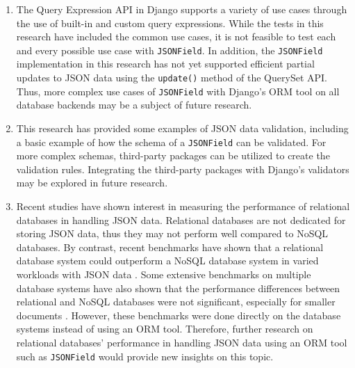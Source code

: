 \begin{enumerate}
	\item The Query Expression API in Django supports a variety of use cases
		  through the use of built-in and custom query expressions. While the
		  tests in this research have included the common use cases, it is not
		  feasible to test each and every possible use case with
		  \verb|JSONField|. In addition, the \verb|JSONField| implementation in
		  this research has not yet supported efficient partial updates to JSON
		  data using the \verb|update()| method of the QuerySet API. Thus, more
		  complex use cases of \verb|JSONField| with Django's ORM tool on all
		  database backends may be a subject of future research.
	\item This research has provided some examples of JSON data validation,
		  including a basic example of how the schema of a \verb|JSONField| can
		  be validated. For more complex schemas, third-party packages can be
		  utilized to create the validation rules. Integrating the third-party
		  packages with Django's validators may be explored in future
		  research.
	\item Recent studies have shown interest in measuring the performance of
		  relational databases in handling JSON data. Relational databases are
		  not dedicated for storing JSON data, thus they may not perform well
		  compared to NoSQL databases. By contrast, recent benchmarks have
		  shown that a relational database system could outperform a NoSQL
		  database system in varied workloads with JSON data
		  \cite{enterprisedb_benchmark}. Some extensive benchmarks on multiple
		  database systems have also shown that the performance differences
		  between relational and NoSQL databases were not significant,
		  especially for smaller documents \cite{dolgov_benchmark}. However,
		  these benchmarks were done directly on the database systems instead
		  of using an ORM tool. Therefore, further research on relational
		  databases' performance in handling JSON data using an ORM tool such
		  as \verb|JSONField| would provide new insights on this topic.
\end{enumerate}
